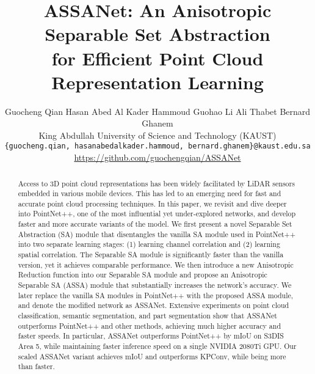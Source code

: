 \documentclass{article}
\begin{document}
\title{ASSANet: An Anisotropic Separable Set Abstraction \\ for Efficient Point Cloud Representation Learning
}

\author{Guocheng Qian 
\And
Hasan Abed Al Kader Hammoud 
\And Guohao Li 
\And Ali Thabet 
\AND Bernard Ghanem \\ 
King Abdullah University of Science and Technology (KAUST)\\
\texttt{\{guocheng.qian, hasanabedalkader.hammoud, bernard.ghanem\}@kaust.edu.sa} \\
\url{https://github.com/guochengqian/ASSANet}
}

\maketitle
\begin{abstract}
Access to 3D point cloud representations has been widely facilitated by LiDAR sensors embedded in various mobile devices. This has led to an emerging need for fast and accurate point cloud processing techniques. In this paper, we revisit and dive deeper into PointNet++, one of the most influential yet under-explored networks, and develop faster and more accurate variants of the model. We first present a novel Separable Set Abstraction (SA) module that disentangles the vanilla SA module used in PointNet++ into two separate learning stages: (1) learning channel correlation and (2) learning spatial correlation. The Separable SA module is significantly faster than the vanilla version, yet it achieves comparable performance.  We then introduce a new Anisotropic Reduction function into our Separable SA module and propose an Anisotropic Separable SA (ASSA) module that substantially increases the network's accuracy. We later replace the vanilla SA modules in PointNet++ with the proposed ASSA module, and denote the modified network as ASSANet. Extensive experiments on point cloud classification, semantic segmentation, and part segmentation show that ASSANet outperforms PointNet++ and other methods, achieving much higher accuracy and faster speeds. In particular, ASSANet outperforms PointNet++ by  mIoU on S3DIS Area 5, while maintaining  faster inference speed on a single NVIDIA 2080Ti GPU. Our scaled ASSANet variant achieves  mIoU and outperforms KPConv, while being more than  faster.

\end{abstract}
\end{document}
